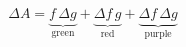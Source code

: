 \documentclass[preview]{standalone}
\begin{document}
\begin{align*}
\Delta A = \underbrace{f\,\Delta g}_{\text{green}} + \underbrace{\Delta f\,g}_{\text{red}} + \underbrace{\Delta f\,\Delta g}_{\text{purple}}
\end{align*}
\end{document}

